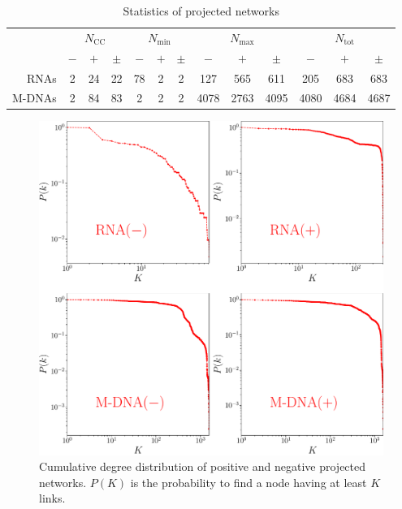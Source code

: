\documentclass[10pt,a4paper]{article}
\begin{document}
\begin{table}[h!]
\centering
\caption{\label{tab:stat}Statistics of projected networks}
\begin{tabular}{|r|c|c|c|c|c|c|c|c|c|c|c|c|}
\cline{2-13}
\multicolumn{1}{c|}{}&\multicolumn{3}{c|}{$N_{\mathrm{CC}}$}&\multicolumn{3}{c}{$N_{\mathrm{min}}$}&\multicolumn{3}{|c}{$N_{\mathrm{max}}$}&\multicolumn{3}{|c|}{$N_{\mathrm{tot}}$}\\
\cline{2-13}
\multicolumn{1}{c|}{}&$-$&$+$&$\pm$&$-$&$+$&$\pm$&$-$&$+$&$\pm$&$-$&$+$&$\pm$\\
\hline
RNAs&2&24&22&78&2&2&127&565&611&205&683&683\\
M-DNAs&2&84&83&2&2&2&4078&2763&4095&4080&4684&4687\\
\hline
\end{tabular}
\end{table}
\begin{figure}[h!]
\centering
\includegraphics[scale=0.3]{degree-distr.pdf}
\caption{\label{fig:degreedistr}Cumulative degree distribution of positive and negative projected networks. $P(K)$ is the probability to find a node having at least $K$ links.}
\end{figure}
\end{document}
